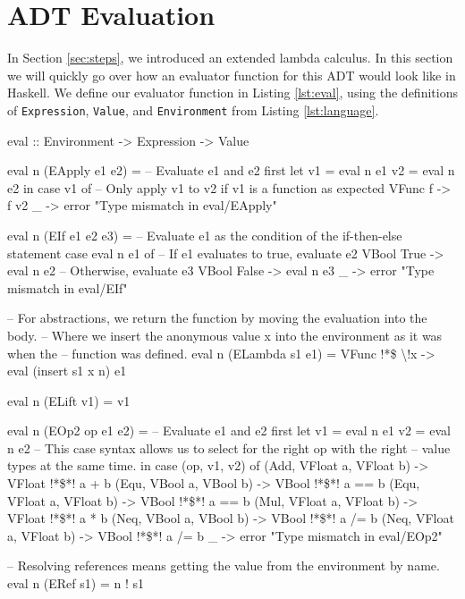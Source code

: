 \section{ADT Evaluation} \label{sec:eval}
    In Section \ref{sec:steps}, we introduced an extended lambda calculus.
    In this section we will quickly go over how an evaluator function for this ADT would look like in Haskell.
    We define our evaluator function in Listing \ref{lst:eval}, using the definitions of \texttt{Expression}, \texttt{Value}, and \texttt{Environment} from Listing \ref{lst:language}.

    \begin{haskell}[caption=ADT Evaluator, label=lst:eval, gobble=8]
        eval :: Environment -> Expression -> Value

        eval n (EApply e1 e2) =
                -- Evaluate e1 and e2 first
            let v1 = eval n e1
                v2 = eval n e2
            in  case v1 of              
                    -- Only apply v1 to v2 if v1 is a function as expected
                    VFunc f -> f v2
                    _       -> error "Type mismatch in eval/EApply"

        eval n (EIf e1 e2 e3) =
            -- Evaluate e1 as the condition of the if-then-else statement
            case eval n e1 of
                -- If e1 evaluates to true, evaluate e2
                VBool True  -> eval n e2
                -- Otherwise, evaluate e3
                VBool False -> eval n e3
                _           -> error "Type mismatch in eval/EIf"

        -- For abstractions, we return the function by moving the evaluation into the body.
        -- Where we insert the anonymous value x into the environment as it was when the
        -- function was defined.
        eval n (ELambda s1 e1) = VFunc !*\$ \textbackslash*!x -> eval (insert s1 x n) e1

        eval n (ELift v1) = v1

        eval n (EOp2 op e1 e2) =
                -- Evaluate e1 and e2 first
            let v1 = eval n e1
                v2 = eval n e2
                -- This case syntax allows us to select for the right op with the right
                -- value types at the same time.
            in case (op, v1, v2) of
                (Add, VFloat a, VFloat b) -> VFloat !*\$*! a +  b
                (Equ, VBool  a, VBool  b) -> VBool  !*\$*! a == b
                (Equ, VFloat a, VFloat b) -> VBool  !*\$*! a == b
                (Mul, VFloat a, VFloat b) -> VFloat !*\$*! a *  b
                (Neq, VBool  a, VBool  b) -> VBool  !*\$*! a /= b
                (Neq, VFloat a, VFloat b) -> VBool  !*\$*! a /= b
                _                         -> error "Type mismatch in eval/EOp2"

        -- Resolving references means getting the value from the environment by name.
        eval n (ERef s1) = n ! s1
    \end{haskell}